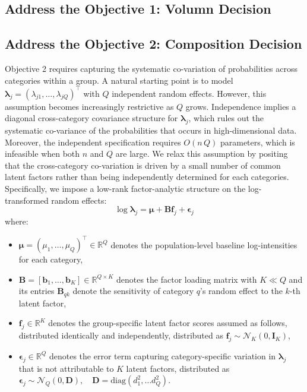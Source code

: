 \documentclass[]{report}
\theoremstyle{definition}
\begin{document}
\subsection{Address the Objective 1: Volumn Decision}
\label{zeta_estimate}


\subsection{Address the Objective 2: Composition Decision}
\label{lambda_estimate}
Objective 2 requires capturing the systematic co-variation of probabilities across categories within a group. A natural starting point is to model $\bm{\lambda}_{j}=(\lambda_{j1},\dots ,\lambda_{jQ})^{\top}$ with $Q$ independent random effects. However, this assumption becomes increasingly restrictive as $Q$ grows. Independence implies a diagonal cross-category covariance structure for $\bm{\lambda}_{j}$, which rules out the systematic co-variance of the probabilities that occurs in high-dimensional data. Moreover, the independent specification requires $O(n\,Q)$ parameters, which is infeasible when both $n$ and $Q$ are large.
We relax this assumption by positing that the cross-category co-variation is driven by a small number of common latent factors rather than being independently determined for each categories. Specifically, we impose a low-rank factor-analytic structure on the log-transformed random effects: 
\begin{equation}
		\log \boldsymbol{\lambda}_{j}=\boldsymbol{\mu}+\mathbf{B}\boldsymbol{f}_{j}+\boldsymbol{\epsilon}_{j}
\end{equation}
where:
\begin{itemize}
\item $\boldsymbol{\mu}=(\mu_{1},\dots ,\mu_{Q})^{\top}\in \mathbb{R}^{Q}$ denotes the population-level baseline log-intensities for each category,
\item $\mathbf{B}=[\boldsymbol{b}_{1},\dots ,\boldsymbol{b}_{K}]\in \mathbb{R}^{Q\times K}$ denotes the factor loading matrix with $K\ll Q$ and its entries $\mathbf{B}_{qk}$ denote the sensitivity of category $q$'s random effect to the $k$-th latent factor,
\item $\boldsymbol{f}_{j}\in \mathbb{R}^{K}$ denotes the group-specific latent factor scores assumed as follows, distributed identically and independently, distributed as $\boldsymbol{f}_{j}\sim \mathcal{N}_{K}(0,\mathbf{I}_{K})$,
\item $\bm{\epsilon}_{j}\in \mathbb{R}^{Q}$ denotes the error term capturing category-specific variation in $\boldsymbol{\lambda}_{j}$ that is not attributable to $K$ latent factors, distributed as $\boldsymbol{\epsilon}_{j}\sim \mathcal{N}_{Q}(0,\mathbf{D}), \quad \mathbf{D}=\text{diag}(d_{1}^{2},\dots d_{Q}^{2})$.
\end{itemize}
\end{document}
